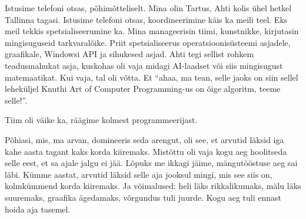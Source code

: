 Istusime telefoni otsas, põhimõtteliselt. Mina olin Tartus, Ahti kolis ühel 
hetkel Tallinna  tagasi. Istusime telefoni otsas, koordineerimine käis ka meili 
teel. Eks meil tekkis spetsialiseerumine ka. Mina manageerisin tiimi, 
kunstnikke, kirjutasin mingisuguseid tarkvaralõike. Priit spetsialiseerus operatsioonisüsteemi asjadele, graafikale,  Windowsi API 
ja sihukesed asjad. Ahti tegi sellist rohkem 
teadusmahukat asja, kuskohas oli vaja midagi AI-laadset või siis mingisugust 
matemaatikat.  Kui vaja, tal oli võtta. Et \enquote{ahaa, ma tean, selle jaoks 
on siin sellel leheküljel Knuthi Art of Computer Programming-us on õige algoritm, teeme selle!}. 


Tiim oli väike ka, räägime kolmest programmeerijast. 


Põhiasi, mis, ma arvan, domineeris seda arengut, oli see, et arvutid läksid iga 
kahe aasta tagant kaks korda kiiremaks. Mistõttu oli vaja kogu aeg hoolitseda 
selle eest, et sa ajale jalgu ei jää. Lõpuks me ikkagi jäime, mängutööstuse aeg 
sai läbi. Kümme aastat, arvutid läksid selle aja jooksul mingi, mis see siis 
on,  kolmkümmend korda kiiremaks. Ja  võimalused: heli läks rikkalikumaks,  
mälu läks suuremaks, graafika ägedamaks, võrgundus tuli juurde. Kogu aeg tuli 
ennast hoida aja tasemel. 



